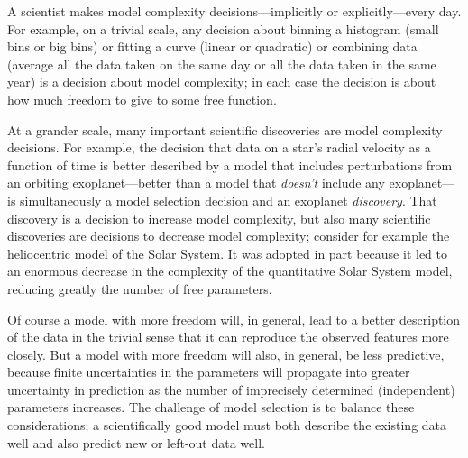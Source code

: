 \documentclass[12pt,twoside]{article}
\begin{document}
A scientist makes model complexity decisions---implicitly or
explicitly---every day.  For example, on a trivial scale, any decision
about binning a histogram (small bins or big bins) or fitting a curve
(linear or quadratic) or combining data (average all the data taken on
the same day or all the data taken in the same year) is a decision
about model complexity; in each case the decision is about how much
freedom to give to some free function.

At a grander scale, many important scientific discoveries are model
complexity decisions.  For example, the decision that data on a star's
radial velocity as a function of time is better described by a model
that includes perturbations from an orbiting exoplanet---better than a
model that \emph{doesn't} include any exoplanet---is simultaneously a
model selection decision and an exoplanet \emph{discovery}.  That
discovery is a decision to increase model complexity, but also many
scientific discoveries are decisions to decrease model complexity;
consider for example the heliocentric model of the Solar System.  It
was adopted in part because it led to an enormous decrease in the
complexity of the quantitative Solar System model, reducing greatly
the number of free parameters.

Of course a model with more freedom will, in general, lead to a better
description of the data in the trivial sense that it can reproduce the
observed features more closely.  But a model with more freedom will
also, in general, be less predictive, because finite uncertainties in
the parameters will propagate into greater uncertainty in prediction
as the number of imprecisely determined (independent) parameters
increases.  The challenge of model selection is to balance these
considerations; a scientifically good model must both describe the
existing data well and also predict new or left-out data well.
\end{document}
